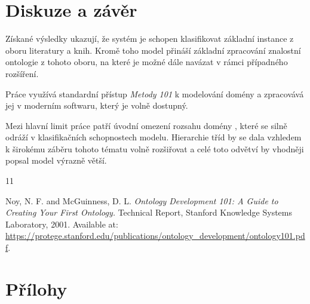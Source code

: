 \documentclass[a4paper,oneside,11pt,usenames,dvipsnames]{article}
\begin{document}
\section{Diskuze a závěr}
Získané výsledky ukazují, že systém je schopen klasifikovat základní instance z oboru literatury a knih. Kromě toho model přináší základní zpracování znalostní ontologie z tohoto oboru, na které je možné dále navázat v rámci případného rozšíření.

Práce využívá standardní přístup \textit{Metody 101} k modelování domény a zpracovává jej v moderním softwaru, který je volně dostupný.

Mezi hlavní limit práce patří úvodní omezení rozsahu domény , které se silně odráží v klasifikačních schopnostech modelu. Hierarchie tříd by se dala vzhledem k širokému záběru tohoto tématu volně rozšiřovat a celé toto odvětví by vhodněji popsal model výrazně větší.


\begin{thebibliography}{11}
\setlength{\parskip}{0ex}

Noy, N. F. and McGuinness, D. L. 
\textit{Ontology Development 101: A Guide to Creating Your First Ontology.} 
Technical Report, Stanford Knowledge Systems Laboratory, 2001.  
Available at: \url{https://protege.stanford.edu/publications/ontology_development/ontology101.pdf}.


\end{thebibliography}

\appendix
\section*{Přílohy}
\end{document}
